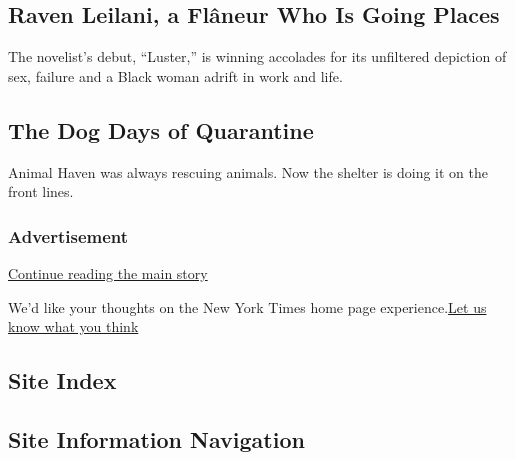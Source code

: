 \href{/2020/07/31/books/raven-leilani-luster.html}{}

\hypertarget{raven-leilani-a-fluxe2neur-who-is-going-places}{%
\subsection{Raven Leilani, a Flâneur Who Is Going
Places}\label{raven-leilani-a-fluxe2neur-who-is-going-places}}

The novelist's debut, ``Luster,'' is winning accolades for its
unfiltered depiction of sex, failure and a Black woman adrift in work
and life.

\href{/2020/07/31/books/raven-leilani-luster.html}{}

\href{/2020/07/30/business/animal-haven-pets-coronavirus.html}{}

\hypertarget{the-dog-days-of-quarantine}{%
\subsection{The Dog Days of
Quarantine}\label{the-dog-days-of-quarantine}}

Animal Haven was always rescuing animals. Now the shelter is doing it on
the front lines.

\href{/2020/07/30/business/animal-haven-pets-coronavirus.html}{}

\hypertarget{advertisement}{%
\subsubsection{Advertisement}\label{advertisement}}

\protect\hyperlink{after-dfp-ad-mid1-large}{Continue reading the main
story}

We'd like your thoughts on the New York Times home page
experience.\href{http://nyt.qualtrics.com/jfe/form/SV_eFJmKj9v0krSE0l}{Let
us know what you think}

\hypertarget{site-index}{%
\subsection{Site Index}\label{site-index}}

\hypertarget{site-information-navigation}{%
\subsection{Site Information
Navigation}\label{site-information-navigation}}

